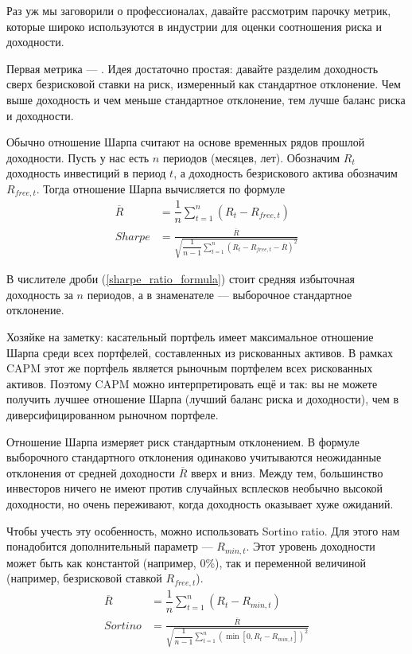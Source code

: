Раз уж мы заговорили о профессионалах, давайте рассмотрим парочку метрик, 
которые широко используются в индустрии для оценки соотношения риска и 
доходности.

Первая метрика --- . Идея достаточно 
простая: давайте разделим доходность сверх безрисковой ставки на риск, 
измеренный как стандартное отклонение. Чем выше доходность и чем меньше 
стандартное отклонение, тем лучше баланс риска и доходности.

Обычно отношение Шарпа считают на основе временных рядов прошлой доходности. 
Пусть у нас есть $n$ периодов (месяцев, лет). Обозначим $R_t$ доходность 
инвестиций в период $t$, а доходность безрискового актива обозначим
$R_{free,t}$. Тогда отношение Шарпа вычисляется по формуле
\begin{align}
\nonumber
\overline{R} &= \dfrac{1}{n}\sum\limits_{t=1}^{n}(R_t - R_{free,t}) \\
Sharpe &= \frac
    {\overline{R}}
    {\sqrt{
        \dfrac{1}{n-1} 
        \sum\limits_{t=1}^{n}(R_t - R_{free,t} - \overline{R})^2
    }}
\label{sharpe_ratio_formula}
\end{align}

В числителе дроби (\ref{sharpe_ratio_formula}) стоит средняя избыточная 
доходность за $n$ периодов, а в знаменателе --- выборочное стандартное 
отклонение.

Хозяйке на заметку: касательный портфель имеет максимальное отношение Шарпа 
среди всех портфелей, составленных из рискованных активов. В рамках CAPM этот же 
портфель является рыночным портфелем всех рискованных активов. Поэтому CAPM 
можно интерпретировать ещё и так: вы не можете получить лучшее отношение Шарпа 
(лучший баланс риска и доходности), чем в диверсифицированном рыночном портфеле.

Отношение Шарпа измеряет риск стандартным отклонением. В формуле выборочного 
стандартного отклонения одинаково учитываются неожиданные отклонения от средней 
доходности $\overline{R}$ вверх и вниз. Между тем, большинство инвесторов ничего 
не имеют против случайных всплесков необычно высокой доходности, но очень 
переживают, когда доходность оказывает хуже ожиданий.

Чтобы учесть эту особенность, можно использовать 
{Sortino ratio}. Для этого нам понадобится дополнительный параметр --- 
$R_{min,t}$. Этот уровень доходности может быть как константой (например, 0\%), 
так и переменной величиной (например, безрисковой ставкой $R_{free,t}$).
\begin{align}
\nonumber
\overline{R} &= \dfrac{1}{n}\sum\limits_{t=1}^{n}(R_t - R_{min,t}) \\
Sortino &= \frac
    {\overline{R}}
    {\sqrt{
        \dfrac{1}{n-1} 
        \sum\limits_{t=1}^{n}\left(\min[0, R_t - R_{min,t}]\right)^2
    }}
\label{sortino_ratio_formula}
\end{align}

